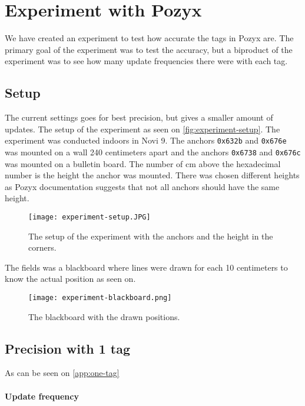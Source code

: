 \section{Experiment with Pozyx}
We have created an experiment to test how accurate the tags in Pozyx are.
The primary goal of the experiment was to test the accuracy, but a biproduct of the experiment was to see how many update frequencies there were with each tag.

\subsection{Setup}
The current settings goes for best precision, but gives a smaller amount of updates.
The setup of the experiment as seen on \autoref{fig:experiment-setup}. 
The experiment was conducted indoors in Novi 9. 
The anchors \texttt{0x632b} and \texttt{0x676e} was mounted on a wall 240 centimeters apart and the anchors \texttt{0x6738} and \texttt{0x676c} was mounted on a bulletin board.
The number of cm above the hexadecimal number is the height the anchor was mounted.
There was chosen different heights as Pozyx documentation suggests that not all anchors should have the same height.

\begin{figure}[H]
    \centering
    \texttt{[image: experiment-setup.JPG]}
    \caption{The setup of the experiment with the anchors and the height in the corners.}
    \label{fig:experiment-setup}
\end{figure}
\noindent
The fields was a blackboard where lines were drawn for each 10 centimeters to know the actual position as seen on.

\begin{figure}[H]
    \centering
    \texttt{[image: experiment-blackboard.png]}
    \caption{The blackboard with the drawn positions.}
    \label{fig:experiment-blackboard}
\end{figure}
 
\subsection{Precision with 1 tag} \label{sec:one-tag-precision}
As can be seen on \autoref{app:one-tag}

\paragraph{Update frequency}

